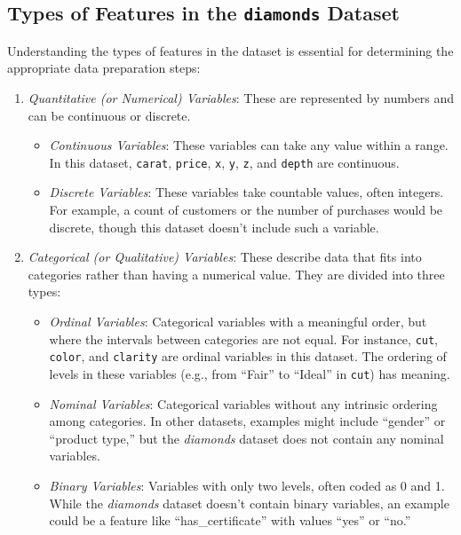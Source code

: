 \documentclass[
]{book}
\newcommand{\passthrough}[1]{#1}
\providecommand{\tightlist}{%
  \setlength{\itemsep}{0pt}\setlength{\parskip}{0pt}}
\theoremstyle{definition}
\theoremstyle{definition}
\theoremstyle{definition}
\theoremstyle{definition}
\theoremstyle{remark}
\begin{document}
\subsection*{\texorpdfstring{Types of Features in the \texttt{diamonds} Dataset}{Types of Features in the diamonds Dataset}}\label{types-of-features-in-the-diamonds-dataset}

Understanding the types of features in the dataset is essential for determining the appropriate data preparation steps:

\begin{enumerate}
\def\labelenumi{\arabic{enumi}.}
\tightlist
\item
  \emph{Quantitative (or Numerical) Variables}: These are represented by numbers and can be continuous or discrete.

  \begin{itemize}
  \tightlist
  \item
    \emph{Continuous Variables}: These variables can take any value within a range. In this dataset, \passthrough{\lstinline!carat!}, \passthrough{\lstinline!price!}, \passthrough{\lstinline!x!}, \passthrough{\lstinline!y!}, \passthrough{\lstinline!z!}, and \passthrough{\lstinline!depth!} are continuous.
  \item
    \emph{Discrete Variables}: These variables take countable values, often integers. For example, a count of customers or the number of purchases would be discrete, though this dataset doesn't include such a variable.
  \end{itemize}
\item
  \emph{Categorical (or Qualitative) Variables}: These describe data that fits into categories rather than having a numerical value. They are divided into three types:

  \begin{itemize}
  \tightlist
  \item
    \emph{Ordinal Variables}: Categorical variables with a meaningful order, but where the intervals between categories are not equal. For instance, \passthrough{\lstinline!cut!}, \passthrough{\lstinline!color!}, and \passthrough{\lstinline!clarity!} are ordinal variables in this dataset. The ordering of levels in these variables (e.g., from ``Fair'' to ``Ideal'' in \passthrough{\lstinline!cut!}) has meaning.
  \item
    \emph{Nominal Variables}: Categorical variables without any intrinsic ordering among categories. In other datasets, examples might include ``gender'' or ``product type,'' but the \emph{diamonds} dataset does not contain any nominal variables.
  \item
    \emph{Binary Variables}: Variables with only two levels, often coded as 0 and 1. While the \emph{diamonds} dataset doesn't contain binary variables, an example could be a feature like ``has\_certificate'' with values ``yes'' or ``no.''
  \end{itemize}
\end{enumerate}
\end{document}
